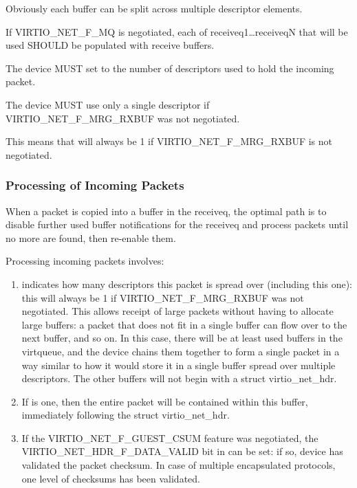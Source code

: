\begin{note}
Obviously each buffer can be split across multiple descriptor elements.
\end{note}

If VIRTIO_NET_F_MQ is negotiated, each of receiveq1\ldots receiveqN
that will be used SHOULD be populated with receive buffers.


The device MUST set  to the number of descriptors used to
hold the incoming packet.

The device MUST use only a single descriptor if VIRTIO_NET_F_MRG_RXBUF
was not negotiated.
\begin{note}
{This means that  will always be 1
if VIRTIO_NET_F_MRG_RXBUF is not negotiated.}
\end{note}

\subsubsection{Processing of Incoming Packets}\label{sec:Device Types / Network Device / Device Operation / Processing of Incoming Packets}
\label{sec:Device Types / Network Device / Device Operation / Processing of Packets}%

When a packet is copied into a buffer in the receiveq, the
optimal path is to disable further used buffer notifications for the
receiveq and process packets until no more are found, then re-enable
them.

Processing incoming packets involves:

\begin{enumerate}
\item {} indicates how many descriptors
  this packet is spread over (including this one): this will
  always be 1 if VIRTIO_NET_F_MRG_RXBUF was not negotiated.
  This allows receipt of large packets without having to allocate large
  buffers: a packet that does not fit in a single buffer can flow
  over to the next buffer, and so on. In this case, there will be
  at least  used buffers in the virtqueue, and the device
  chains them together to form a single packet in a way similar to
  how it would store it in a single buffer spread over multiple
  descriptors.
  The other buffers will not begin with a struct virtio_net_hdr.

\item If
   is one, then the entire packet will be
  contained within this buffer, immediately following the struct
  virtio_net_hdr.
\item If the VIRTIO_NET_F_GUEST_CSUM feature was negotiated, the
  VIRTIO_NET_HDR_F_DATA_VALID bit in  can be
  set: if so, device has validated the packet checksum.
  In case of multiple encapsulated protocols, one level of checksums
  has been validated.
\end{enumerate}

